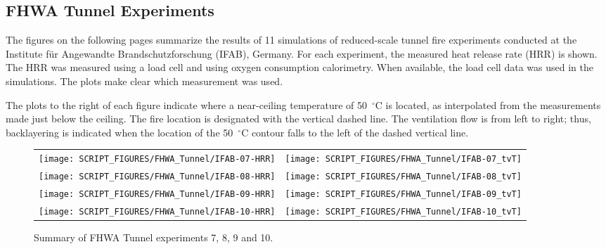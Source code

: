 \clearpage

\subsection{FHWA Tunnel Experiments}
\label{FHWA_Tunnel_Results}

The figures on the following pages summarize the results of 11 simulations of reduced-scale tunnel fire experiments conducted at the Institute f{\"u}r Angewandte Brandschutzforschung (IFAB), Germany. For each experiment, the measured heat release rate (HRR) is shown. The HRR was measured using a load cell and using oxygen consumption calorimetry. When available, the load cell data was used in the simulations. The plots make clear which measurement was used.

The plots to the right of each figure indicate where a near-ceiling temperature of 50~$^\circ$C is located, as interpolated from the measurements made just below the ceiling. The fire location is designated with the vertical dashed line. The ventilation flow is from left to right; thus, backlayering is indicated when the location of the 50~$^\circ$C contour falls to the left of the dashed vertical line.

\newpage

\begin{figure}[p]
\begin{tabular*}{\textwidth}{l@{\extracolsep{\fill}}r}
\texttt{[image: SCRIPT\_FIGURES/FHWA\_Tunnel/IFAB-07-HRR]} &
\texttt{[image: SCRIPT\_FIGURES/FHWA\_Tunnel/IFAB-07\_tvT]} \\
\texttt{[image: SCRIPT\_FIGURES/FHWA\_Tunnel/IFAB-08-HRR]} &
\texttt{[image: SCRIPT\_FIGURES/FHWA\_Tunnel/IFAB-08\_tvT]} \\
\texttt{[image: SCRIPT\_FIGURES/FHWA\_Tunnel/IFAB-09-HRR]} &
\texttt{[image: SCRIPT\_FIGURES/FHWA\_Tunnel/IFAB-09\_tvT]} \\
\texttt{[image: SCRIPT\_FIGURES/FHWA\_Tunnel/IFAB-10-HRR]} &
\texttt{[image: SCRIPT\_FIGURES/FHWA\_Tunnel/IFAB-10\_tvT]}
\end{tabular*}
\caption[Summary of FHWA Tunnel experiments 7, 8, 9 and 10]{Summary of FHWA Tunnel experiments 7, 8, 9 and 10.}
\label{FHWA_Tunnel_Results_1}
\end{figure}

